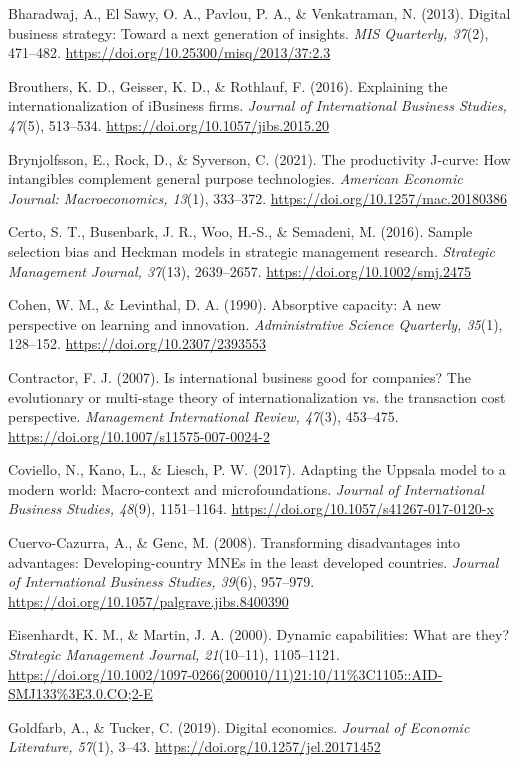 \documentclass[12pt,a4paper]{article}
\begin{document}
Bharadwaj, A., El Sawy, O. A., Pavlou, P. A., \& Venkatraman, N. (2013).
Digital business strategy: Toward a next generation of insights.
\emph{MIS Quarterly, 37}(2), 471--482.
\url{https://doi.org/10.25300/misq/2013/37:2.3}

Brouthers, K. D., Geisser, K. D., \& Rothlauf, F. (2016). Explaining the
internationalization of iBusiness firms. \emph{Journal of International
Business Studies, 47}(5), 513--534.
\url{https://doi.org/10.1057/jibs.2015.20}

Brynjolfsson, E., Rock, D., \& Syverson, C. (2021). The productivity
J-curve: How intangibles complement general purpose technologies.
\emph{American Economic Journal: Macroeconomics, 13}(1), 333--372.
\url{https://doi.org/10.1257/mac.20180386}

Certo, S. T., Busenbark, J. R., Woo, H.-S., \& Semadeni, M. (2016).
Sample selection bias and Heckman models in strategic management
research. \emph{Strategic Management Journal, 37}(13), 2639--2657.
\url{https://doi.org/10.1002/smj.2475}

Cohen, W. M., \& Levinthal, D. A. (1990). Absorptive capacity: A new
perspective on learning and innovation. \emph{Administrative Science
Quarterly, 35}(1), 128--152. \url{https://doi.org/10.2307/2393553}

Contractor, F. J. (2007). Is international business good for companies?
The evolutionary or multi-stage theory of internationalization vs. the
transaction cost perspective. \emph{Management International Review,
47}(3), 453--475. \url{https://doi.org/10.1007/s11575-007-0024-2}

Coviello, N., Kano, L., \& Liesch, P. W. (2017). Adapting the Uppsala
model to a modern world: Macro-context and microfoundations.
\emph{Journal of International Business Studies, 48}(9), 1151--1164.
\url{https://doi.org/10.1057/s41267-017-0120-x}

Cuervo-Cazurra, A., \& Genc, M. (2008). Transforming disadvantages into
advantages: Developing-country MNEs in the least developed countries.
\emph{Journal of International Business Studies, 39}(6), 957--979.
\url{https://doi.org/10.1057/palgrave.jibs.8400390}

Eisenhardt, K. M., \& Martin, J. A. (2000). Dynamic capabilities: What
are they? \emph{Strategic Management Journal, 21}(10--11), 1105--1121.
\url{https://doi.org/10.1002/1097-0266(200010/11)21:10/11\%3C1105::AID-SMJ133\%3E3.0.CO;2-E}

Goldfarb, A., \& Tucker, C. (2019). Digital economics. \emph{Journal of
Economic Literature, 57}(1), 3--43.
\url{https://doi.org/10.1257/jel.20171452}
\end{document}

